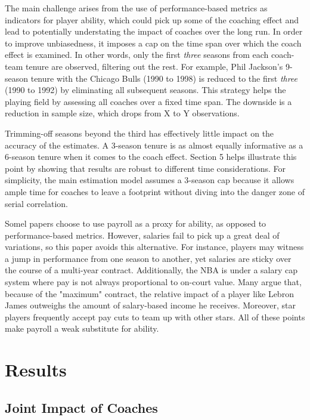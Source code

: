 \documentclass[main.tex]{subfiles}
\begin{document}
The main challenge arises from the use of performance-based metrics as indicators for player ability, which could pick up some of the coaching effect and lead to potentially understating the impact of coaches over the long run. In order to improve unbiasedness, it imposes a cap on the time span over which the coach effect is examined. In other words, only the first \textit{three} seasons from each coach-team tenure are observed, filtering out the rest. For example, Phil Jackson's 9-season tenure with the Chicago Bulls (1990 to 1998) is reduced to the first \textit{three} (1990 to 1992) by eliminating all subsequent seasons. This strategy helps the playing field by assessing all coaches over a fixed time span. The downside is a reduction in sample size, which drops from X to Y observations.

Trimming-off seasons beyond the third has effectively little impact on the accuracy of the estimates. A 3-season tenure is as almost equally informative as a 6-season tenure when it comes to the coach effect. Section 5 helps illustrate this point by showing that results are robust to different time considerations. For simplicity, the main estimation model assumes a 3-season cap because it allows ample time for coaches to leave a footprint without diving into the danger zone of serial correlation.

Somel papers choose to use payroll as a proxy for ability, as opposed to performance-based metrics. However, salaries fail to pick up a great deal of variations, so this paper avoids this alternative. For instance, players may witness a jump in performance from one season to another, yet salaries are sticky over the course of a multi-year contract. Additionally, the NBA is under a salary cap system where pay is not always proportional to on-court value. Many argue that, because of the "maximum" contract, the relative impact of a player like Lebron James outweighs the amount of salary-based income he receives. Moreover, star players frequently accept pay cuts to team up with other stars. All of these points make payroll a weak substitute for ability. 

\section{Results}

\subsection{Joint Impact of Coaches}
\end{document}
